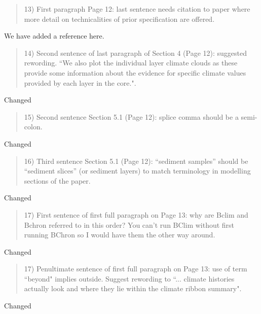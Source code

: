 \documentclass[a4paper,11pt]{article}
\begin{document}
\begin{framed} \begin{quote}
13) First paragraph Page 12: last sentence needs citation to paper where more detail on technicalities of prior specification are offered.
\end{quote} \end{framed}
We have added a reference here.

\begin{framed} \begin{quote}
14) Second sentence of last paragraph of Section 4 (Page 12): suggested rewording.  ``We also plot the individual layer climate clouds as these provide some information about the evidence for specific climate values provided by each layer in the core.".
\end{quote} \end{framed}
Changed 

\begin{framed} \begin{quote}
15) Second sentence Section 5.1 (Page 12): splice comma should be a semi-colon.
\end{quote} \end{framed}
Changed 

\begin{framed} \begin{quote}
16) Third sentence Section 5.1 (Page 12): ``sediment samples'' should be ``sediment slices'' (or sediment layers) to match terminology in modelling sections of the paper.
\end{quote} \end{framed}
Changed 

\begin{framed} \begin{quote}
17) First sentence of first full paragraph on Page 13: why are Bclim and Bchron referred to in this order? You can't run BClim without first running BChron so I would have them the other way around.
\end{quote} \end{framed}
Changed 

\begin{framed} \begin{quote}
17) Penultimate sentence of first full paragraph on Page 13: use of term ``beyond" implies outside.  Suggest rewording to ``... climate histories actually look and where they lie within the climate ribbon summary".
\end{quote} \end{framed}
Changed
\end{document}
